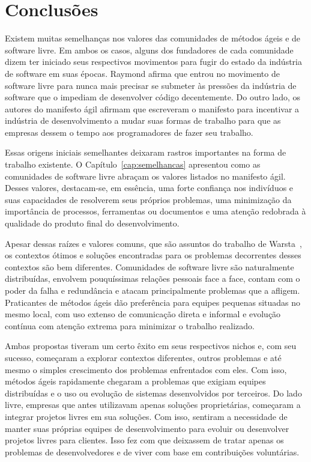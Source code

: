 \chapter{Conclusões}
\label{cap:conclusoes}


Existem muitas semelhanças nos valores das comunidades de métodos
ágeis e de software livre. Em ambos os casos, alguns dos fundadores de
cada comunidade dizem ter iniciado seus respectivos movimentos para
fugir do estado da indústria de software em suas épocas. Raymond
afirma que entrou no movimento de software livre para nunca mais
precisar se submeter às pressões da indústria de software que o
impediam de desenvolver código decentemente. Do outro lado, os autores
do manifesto ágil afirmam que escreveram o manifesto para incentivar a
indústria de desenvolvimento a mudar suas formas de trabalho para que
as empresas dessem o tempo aos programadores de fazer seu trabalho.

Essas origens iniciais semelhantes deixaram rastros importantes na
forma de trabalho existente. O Capítulo~\ref{cap:semelhancas}
apresentou como as comunidades de software livre abraçam os valores
listados no manifesto ágil. Desses valores, destacam-se, em essência,
uma forte confiança nos indivíduos e suas capacidades de resolverem
seus próprios problemas, uma minimização da importância de processos,
ferramentas ou documentos e uma atenção redobrada à qualidade do
produto final do desenvolvimento.

Apesar dessas raízes e valores comuns, que são assuntos do trabalho de
Warsta~\cite{Warsta2002}, os contextos ótimos e soluções encontradas
para os problemas decorrentes desses contextos são bem
diferentes. Comunidades de software livre são naturalmente
distribuídas, envolvem pouquíssimas relações pessoais face a face,
contam com o poder da falha e redundância e atacam principalmente
problemas que a afligem. Praticantes de métodos ágeis dão preferência
para equipes pequenas situadas no mesmo local, com uso extenso de
comunicação direta e informal e evolução contínua com atenção extrema
para minimizar o trabalho realizado.

Ambas propostas tiveram um certo êxito em seus respectivos nichos e,
com seu sucesso, começaram a explorar contextos diferentes, outros
problemas e até mesmo o simples crescimento dos problemas enfrentados
com eles. Com isso, métodos ágeis rapidamente chegaram a problemas que
exigiam equipes distribuídas e o uso ou evolução de sistemas
desenvolvidos por terceiros. Do lado livre, empresas que antes
utilizavam apenas soluções proprietárias, começaram a integrar
projetos livres em sua soluções. Com isso, sentiram a necessidade de
manter suas próprias equipes de desenvolvimento para evoluir ou
desenvolver projetos livres para clientes. Isso fez com que deixassem
de tratar apenas os problemas de desenvolvedores e de viver com base
em contribuições voluntárias.

